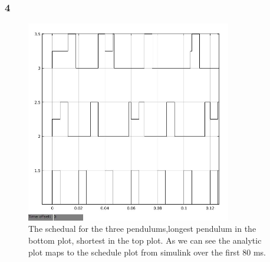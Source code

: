 \documentclass[10pt,a4paper]{article}
\begin{document}
\subsubsection*{4}
\begin{figure}[!h]
  \centering
    \includegraphics[width=0.8\textwidth]{schedual6msedf.jpg}
      \caption{The schedual for the three pendulums,longest pendulum in the bottom plot, shortest in the top plot. As we can see the analytic plot maps to the schedule plot from simulink over the first 80 ms.}
\end{figure}
\end{document}
